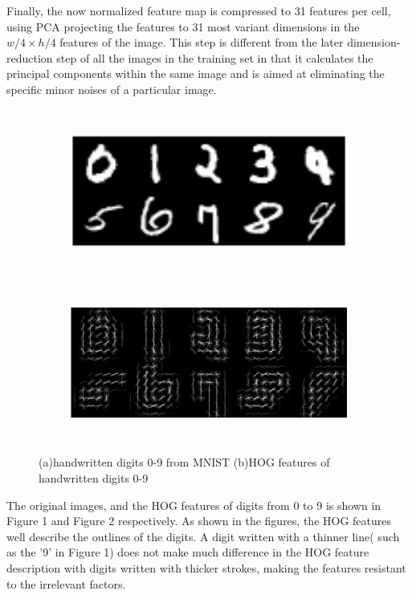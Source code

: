 \documentclass[12pt]{article}
\begin{document}
Finally, the now normalized feature map is compressed to 31 features per cell, using PCA projecting the features to 31 most variant dimensions in the $ w/4 \times h/4 $ features of the image. This step is different from the later dimension-reduction step of all the images in the training set in that it calculates the principal components within the same image and is aimed at eliminating the specific minor noises of a particular image.
\begin{figure}[h]
\centering
	\begin{subfigure}{.85\textwidth}
		\includegraphics[height = 2.1in]{image.png}		
		\caption{ }
	\end{subfigure}
	\begin{subfigure}{.85\textwidth}
		\includegraphics[height = 2in]{hog.png}	
		\caption{ }
	\end{subfigure}
	\caption{ (a)handwritten digits 0-9 from MNIST (b)HOG features of handwritten digits 0-9}
	\label{fig:norm}
	\end{figure}

The original images, and the HOG features of digits from 0 to 9 is shown in Figure 1 and Figure 2 respectively. As shown in the figures, the HOG features well describe the outlines of the digits. A digit written with a thinner line( such as the '9' in Figure 1) does not make much difference in the HOG feature description with digits written with thicker strokes, making the features resistant to the irrelevant factors.
\end{document}
